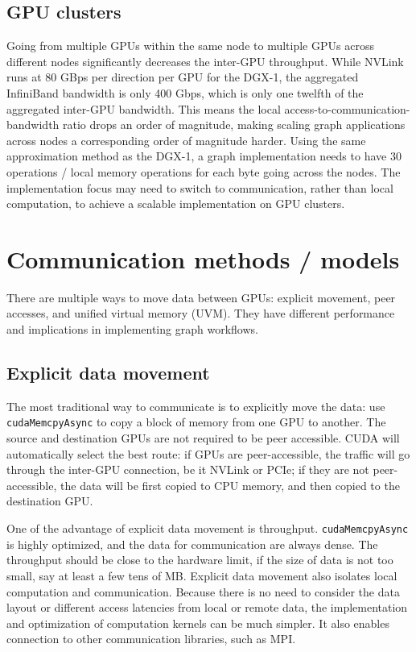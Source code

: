 \documentclass[10pt,oneside]{memoir}
\begin{document}
\hypertarget{gpu-clusters}{%
\subsection{GPU clusters}\label{gpu-clusters}}

Going from multiple GPUs within the same node to multiple GPUs across
different nodes significantly decreases the inter-GPU throughput. While
NVLink runs at 80 GBps per direction per GPU for the DGX-1, the
aggregated InfiniBand bandwidth is only 400 Gbps, which is only one
twelfth of the aggregated inter-GPU bandwidth. This means the local
access-to-communication-bandwidth ratio drops an order of magnitude,
making scaling graph applications across nodes a corresponding order of
magnitude harder. Using the same approximation method as the DGX-1, a
graph implementation needs to have 30 operations / local memory
operations for each byte going across the nodes. The implementation
focus may need to switch to communication, rather than local
computation, to achieve a scalable implementation on GPU clusters.

\hypertarget{communication-methods-models}{%
\section{Communication methods /
models}\label{communication-methods-models}}

There are multiple ways to move data between GPUs: explicit movement,
peer accesses, and unified virtual memory (UVM). They have different
performance and implications in implementing graph workflows.

\hypertarget{explicit-data-movement}{%
\subsection{Explicit data movement}\label{explicit-data-movement}}

The most traditional way to communicate is to explicitly move the data:
use \texttt{cudaMemcpyAsync} to copy a block of memory from one GPU to
another. The source and destination GPUs are not required to be peer
accessible. CUDA will automatically select the best route: if GPUs are
peer-accessible, the traffic will go through the inter-GPU connection,
be it NVLink or PCIe; if they are not peer-accessible, the data will be
first copied to CPU memory, and then copied to the destination GPU.

One of the advantage of explicit data movement is throughput.
\texttt{cudaMemcpyAsync} is highly optimized, and the data for
communication are always dense. The throughput should be close to the
hardware limit, if the size of data is not too small, say at least a few
tens of MB. Explicit data movement also isolates local computation and
communication. Because there is no need to consider the data layout or
different access latencies from local or remote data, the implementation
and optimization of computation kernels can be much simpler. It also
enables connection to other communication libraries, such as MPI.
\end{document}
